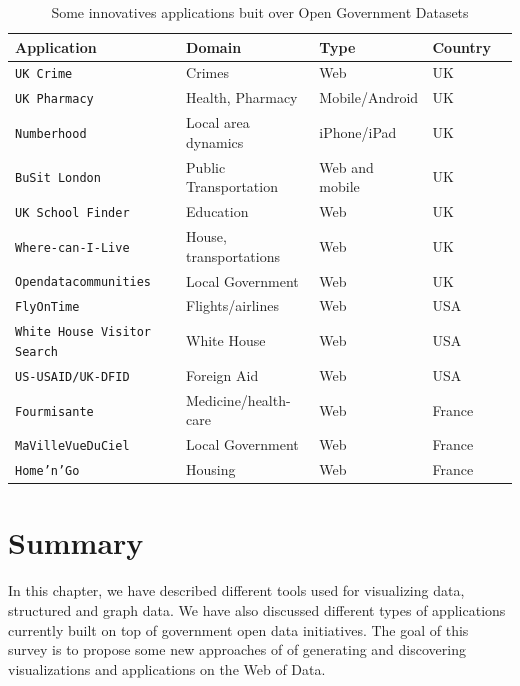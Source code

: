 \begin{table}[ht!b]
    \caption{Some innovatives applications buit over Open Government Datasets} \label{tab:apps-survey}
    \small
    \center
   \begin{tabularx}{\textwidth}{@{}llllX@{}}
    \toprule
    \textbf{Application} & \textbf{Domain} & \textbf{Type} &  \textbf{Country}  \\
    \toprule
    \texttt{UK Crime} &	Crimes & Web & UK  \\
    \midrule
\texttt{UK Pharmacy} & Health, Pharmacy  & Mobile/Android  & UK \\ 
	\midrule
	\texttt{Numberhood} & Local area dynamics  & iPhone/iPad & UK \\
	
	\midrule
	\texttt{BuSit London} & Public Transportation  & Web and mobile  & UK \\
	
	\midrule
	\texttt{UK School Finder} & Education  & Web  & UK \\
	
	\midrule
	\texttt{Where-can-I-Live} & House, transportations & Web  & UK \\
	\midrule
	
	\texttt{Opendatacommunities} & Local Government & Web  & UK \\
	\midrule
	
	\texttt{FlyOnTime } & Flights/airlines & Web  & USA \\
	\midrule
	
	\texttt{White House Visitor Search} & White House & Web  & USA \\
	\midrule
	
	\texttt{US-USAID/UK-DFID} & Foreign Aid & Web  & USA \\
	\midrule
	
	\texttt{Fourmisante} & Medicine/health-care & Web  & France \\
	\midrule
	
	\texttt{MaVilleVueDuCiel} & Local Government  & Web & France \\
	\midrule
	
	\texttt{Home'n'Go } & Housing & Web & France \\
	
	
    \bottomrule
  
    \end{tabularx}
    \end{table}
    
  \section{Summary}
  In this chapter, we have described different tools used for visualizing data, structured and graph data. We have also discussed different types of applications currently built on top of government open data initiatives. The goal of this survey is to propose some new approaches of of generating and discovering visualizations and applications on the Web of Data. 
